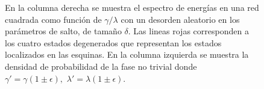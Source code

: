 \begin{figure}[h!]
     
       \caption{En la columna derecha se muestra el espectro de energías en una red cuadrada como función de $\gamma/\lambda $ con un desorden aleatorio en los parámetros de salto, de tamaño $\delta$. Las lineas rojas corresponden a los cuatro estados degenerados que representan los estados localizados en las esquinas. En la columna izquierda se muestra la densidad de probabilidad de la fase no trivial donde $\gamma' = \gamma( 1 \pm \epsilon) ,\, \, \lambda' = \lambda( 1 \pm \epsilon)$.  }
    \label{fig:Pram_Proy_Delta_cuadrado}
\end{figure}